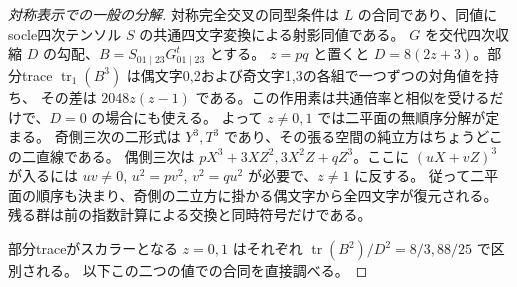 \begin{proof}[対称表示での一般の分解]
対称完全交叉の同型条件は $L$ の合同であり、同値にsocle四次テンソル $S$ の共通四文字変換による射影同値である。
$G$ を交代四次収縮 $D$ の勾配、$B=S_{01\mid23}G_{01\mid23}^{t}$ とする。
$z=pq$ と置くと $D=8(2z+3)$。部分trace $\operatorname{tr}_{1}(B^3)$ は偶文字0,2および奇文字1,3の各組で一つずつの対角値を持ち、
その差は $2048z(z-1)$ である。この作用素は共通倍率と相似を受けるだけで、$D=0$ の場合にも使える。
よって $z\ne0,1$ では二平面の無順序分解が定まる。
奇側三次の二形式は $Y^3,T^3$ であり、その張る空間の純立方はちょうどこの二直線である。
偶側三次は $pX^3+3XZ^2,3X^2Z+qZ^3$。ここに $(uX+vZ)^3$ が入るには
$uv\ne0$, $u^2=pv^2$, $v^2=qu^2$ が必要で、$z\ne1$ に反する。
従って二平面の順序も決まり、奇側の二立方に掛かる偶文字から全四文字が復元される。
残る群は前の指数計算による交換と同時符号だけである。

部分traceがスカラーとなる $z=0,1$ はそれぞれ $\operatorname{tr}(B^2)/D^2=8/3,88/25$ で区別される。
以下この二つの値での合同を直接調べる。
\end{proof}

